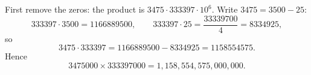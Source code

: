 First remove the zeros: the product is $3475\cdot333397\cdot10^6$. Write $3475=3500-25$:
\[333397\cdot3500=1166889500,\qquad 333397\cdot25=\dfrac{33339700}{4}=8334925,\]
so
\[3475\cdot333397=1166889500-8334925=1158554575 .\]
Hence
\[3475000\times333397000=\boxed{1{,}158{,}554{,}575{,}000{,}000}.\]

